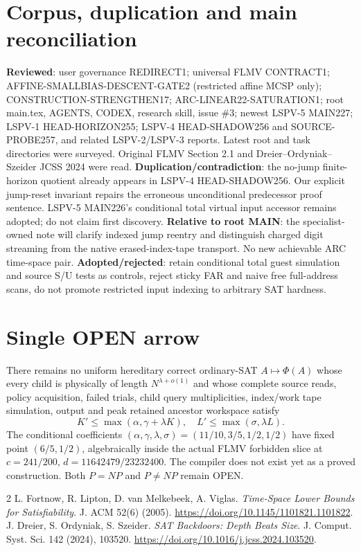 \documentclass[10pt]{article}
\begin{document}
\section{Corpus, duplication and main reconciliation}
\textbf{Reviewed}: user governance REDIRECT1; universal FLMV CONTRACT1; AFFINE-SMALLBIAS-DESCENT-GATE2 (restricted affine MCSP only); CONSTRUCTION-STRENGTHEN17; ARC-LINEAR22-SATURATION1; root main.tex, AGENTS, CODEX, research skill, issue \#3; newest LSPV-5 MAIN227; LSPV-1 HEAD-HORIZON255; LSPV-4 HEAD-SHADOW256 and SOURCE-PROBE257, and related LSPV-2/LSPV-3 reports. Latest root and task directories were surveyed. Original FLMV Section 2.1 and Dreier--Ordyniak--Szeider JCSS 2024 were read.
\textbf{Duplication/contradiction}: the no-jump finite-horizon quotient already appears in LSPV-4 HEAD-SHADOW256. Our explicit jump-reset invariant repairs the erroneous unconditional predecessor proof sentence. LSPV-5 MAIN226's conditional total virtual input accessor remains adopted; do not claim first discovery. \textbf{Relative to root MAIN}: the specialist-owned note will clarify indexed jump reentry and distinguish charged digit streaming from the native erased-index-tape transport. No new achievable ARC time-space pair. \textbf{Adopted/rejected}: retain conditional total guest simulation and source S/U tests as controls, reject sticky FAR and naive free full-address scans, do not promote restricted input indexing to arbitrary SAT hardness.

\section{Single OPEN arrow}
There remains no uniform hereditary correct ordinary-SAT $A\mapsto\Phi(A)$ whose every child is physically of length $N^{\lambda+o(1)}$ and whose complete source reads, policy acquisition, failed trials, child query multiplicities, index/work tape simulation, output and peak retained ancestor workspace satisfy
\[
K'\le \max(\alpha,\gamma+\lambda K),\quad L'\le\max(\sigma,\lambda L).
\]
The conditional coefficients $(\alpha,\gamma,\lambda,\sigma)=(11/10,3/5,1/2,1/2)$ have fixed point $(6/5,1/2)$, algebraically inside the actual FLMV forbidden slice at $c=241/200$, $d=11642479/23232400$. The compiler does not exist yet as a proved construction. Both $P=NP$ and $P\ne NP$ remain OPEN.

\begin{thebibliography}{2}
 L. Fortnow, R. Lipton, D. van Melkebeek, A. Viglas. \emph{Time-Space Lower Bounds for Satisfiability}. J. ACM 52(6) (2005). \url{https://doi.org/10.1145/1101821.1101822}.
 J. Dreier, S. Ordyniak, S. Szeider. \emph{SAT Backdoors: Depth Beats Size}. J. Comput. Syst. Sci. 142 (2024), 103520. \url{https://doi.org/10.1016/j.jcss.2024.103520}.
\end{thebibliography}
\end{document}
